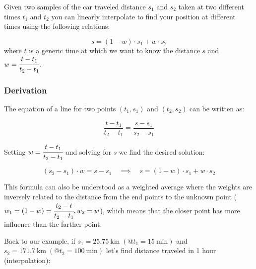 Given two samples of the car traveled distance \(s_1\) and \(s_2\) taken at two different times \(t_1\) and \(t_2\) you can linearly interpolate to find your position at different times using the following relations:

\begin{equation}
s = (1 - w)\cdot s_1 + w \cdot s_2
\end{equation}
where $t$ is a generic time at which we want to know the distance $s$ and \(w = \cfrac{t - t_1}{t_2 - t_1}\).

\begin{attention}
\subsubsection{Derivation}
The equation of a line for two points
\((t_1, s_1)\) and \((t_2, s_2)\) can be written as:

\begin{equation}
\frac{t - t_1}{t_2 - t_1} = \frac{s - s_1}{s_2 - s_1}
\end{equation}

Setting \(w = \cfrac{t - t_1}{t_2 - t_1}\) and solving for \(s\) we find the desired solution:

\begin{equation}(s_2 - s_1)\cdot w = s - s_1\quad\implies\quad s = (1 - w)\cdot s_1 + w \cdot s_2
\end{equation}

This formula can also be understood as a weighted average where the weights are inversely related to the distance from the end points to the unknown point ($w_1 = (1 - w) = \cfrac{t_2 - t}{t_2 -t_1}, w_2 = w$), which means that the closer point has more influence than the farther point.
\end{attention}

Back to our example, if
\(s_1 = 25.75~\mathrm{km}\;(@t_1 = 15~\mathrm{min})\) and
\(s_2 = 171.7~\mathrm{km}\;(@t_2 = 100~\mathrm{min})\) let's find distance traveled in 1 hour (interpolation):


